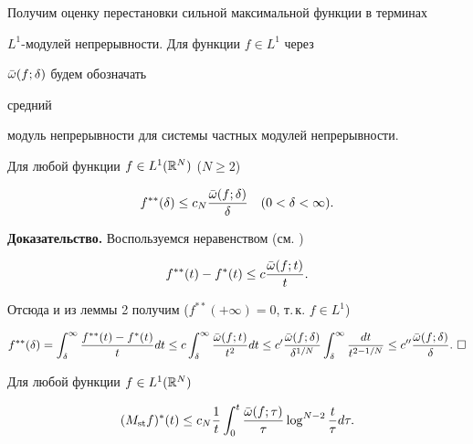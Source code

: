  


Получим оценку перестановки сильной максимальной функции в терминах 


$L^1$-модулей непрерывности. Для функции $f\in L^1$ через 


$\Bar\omega(f;\delta)$ будем обозначать 


средний 


модуль непрерывности для системы частных модулей непрерывности. 


 


\begin{lem} Для любой функции $f\in L^1(\Bbb R^N)$ ($N\ge 2$) 


\begin{equation} 


f^{**}(\delta)\le c_N\frac{\Bar\omega(f;\delta)}{\delta}\quad 


(0<\delta<\infty). 


\end{equation} 


\end{lem} 


 


{\bf Доказательство.} Воспользуемся неравенством (см. \cite{Kol3}) 


$$ 


f^{**}(t)-f^*(t)\le c\frac{\Bar\omega(f;t)}{t}. 


$$ 


Отсюда и из леммы 2 получим ($f^{**}(+\infty)=0$, т.\,к. $f\in L^1$) 


$$


f^{**}(\delta)=\int^\infty_\delta\frac{f^{**}(t)-f^*(t)}{t}dt \le 


c\int^\infty_\delta\frac{\Bar\omega(f;t)}{t^2}dt \le  


c'\frac{\Bar\omega(f;\delta)}{\delta^{1/N}} 


\int^\infty_\delta\frac{dt}{t^{2-1/N}} \le 


c''\frac{\Bar\omega(f;\delta)}{\delta}. \ \square 


$$


 


\begin{thm} Для любой функции $f\in L^1(\Bbb R^N)$ 


\begin{equation} 


(M_{\st} f)^*(t)\le c_N\frac{1}{t}\int_0^t 


\frac{\Bar\omega(f;\tau)}{\tau}\log^{N-2}\frac{t}{\tau}d\tau. 


\end{equation} 


\end{thm} 


